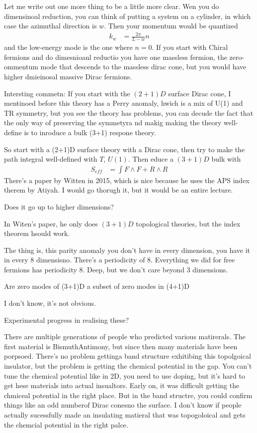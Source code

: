 Let me write out one more thing to be a little more clear.
Wen you do dimensinoal reduction,
you can think of putting a system on a cylinder,
in which case the azimuthal direction is $w$.
Then your momentum would be quantized
\begin{align}
    k_w &= \frac{2\pi}{L-w}n
\end{align}
and the low-energy mode is the one where $n=0$.
If you start with Chiral fermions and do dimesnioanl reductio
you have one massless fermion, the zero-ommentum mode
that descends to the massless dirac cone,
but you would have higher dmieinosal massive Dirac fermions.


Intersting commetn:
If you start with the $(2+1)D$ surface Dirac cone,
I mentinoed before this theory has a Perry anomaly,
hwich is a mix of U(1) and TR symmetry,
but you see the theory has problems,
you can decude the fact that the only way of preserving the symmetyra nd makig
making the theory well-define is to inroduce a bulk (3+1) respone theory.

So start with a (2+1)D surface theory with a Dirac cone,
then try to make the path integral well-defined with
$T$, $U(1)$.
Then educe a $(3+1)D$ bulk with
\begin{align}
    S_{eff} &=
    \int F\wedge F + R\wedge R
\end{align}
There's a paper by Witten in 2015,
which is nice because he uses the APS index therem by Atiyah.
I would go thorugh it,
but it would be an entire lecture.

\begin{question}
    Does it go up to higher dimensions?
\end{question}
In Witen's paper,
he only does $(3+1)D$ topological theories,
but the index theorem hsould work.

The thing is,
this parity anomaly you don't have in every dimension,
you have it in every 8 dimensisno.
There's a periodicity of 8.
Everything we did for free fermions has periodicity 8.
Deep,
but we don't care beyond 3 dimensions.

\begin{question}
    Are zero modes of (3+1)D a subset of zero modes in (4+1)D
\end{question}
I don't know, it's not obvious.

\begin{question}
    Experimental progress in realising these?
\end{question}
There are multiple generations of people who predicted various matirerals.
The first material is BismuthAntimony,
but since then many materials have been porpsoed.
There's no problem gettinga band structure exhitibing this topolgoical
insulator,
but the problem is getting the chemical potential in the gap.
You can't tune the chemical potential like in 2D,
you need to use doping,
but it's hard to get hese materials into actual insualtors.
Early on,
it was difficult getting the chmiceal potential in the right place.
But in the band structre,
you could confirm things like an odd numberof Dirac conesno the surface.
I don't know if people actually sucessfully made an insulating matieral that was
topogoloical and gets the chemcial potential in the right palce.

